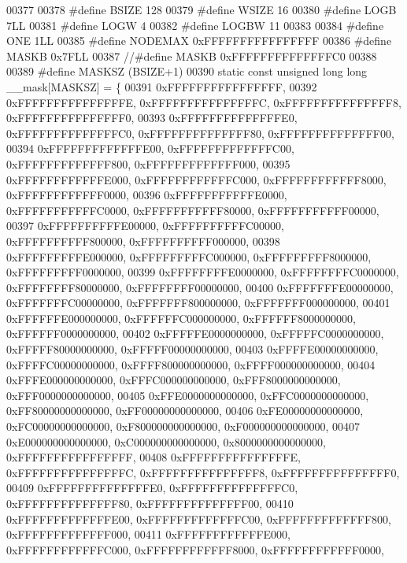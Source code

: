 \begin{DoxyCode}
00377 
00378 \textcolor{preprocessor}{#define BSIZE 128}
00379 \textcolor{preprocessor}{#define WSIZE 16}
00380 \textcolor{preprocessor}{#define LOGB 7LL}
00381 \textcolor{preprocessor}{#define LOGW 4}
00382 \textcolor{preprocessor}{#define LOGBW 11}
00383 
00384 \textcolor{preprocessor}{#define ONE 1LL}
00385 \textcolor{preprocessor}{#define NODEMAX 0xFFFFFFFFFFFFFFFF}
00386 \textcolor{preprocessor}{#define MASKB 0x7FLL}
00387 \textcolor{comment}{//#define MASKB 0xFFFFFFFFFFFFFFC0}
00388 
00389 \textcolor{preprocessor}{#define MASKSZ (BSIZE+1)}
00390 \textcolor{keyword}{static} \textcolor{keyword}{const} \textcolor{keywordtype}{unsigned} \textcolor{keywordtype}{long} \textcolor{keywordtype}{long} \_\_mask[MASKSZ] = \{
00391         0xFFFFFFFFFFFFFFFF,
00392         0xFFFFFFFFFFFFFFFE, 0xFFFFFFFFFFFFFFFC, 0xFFFFFFFFFFFFFFF8, 0xFFFFFFFFFFFFFFF0,
00393         0xFFFFFFFFFFFFFFE0, 0xFFFFFFFFFFFFFFC0, 0xFFFFFFFFFFFFFF80, 0xFFFFFFFFFFFFFF00,
00394         0xFFFFFFFFFFFFFE00, 0xFFFFFFFFFFFFFC00, 0xFFFFFFFFFFFFF800, 0xFFFFFFFFFFFFF000,
00395         0xFFFFFFFFFFFFE000, 0xFFFFFFFFFFFFC000, 0xFFFFFFFFFFFF8000, 0xFFFFFFFFFFFF0000,
00396         0xFFFFFFFFFFFE0000, 0xFFFFFFFFFFFC0000, 0xFFFFFFFFFFF80000, 0xFFFFFFFFFFF00000,
00397         0xFFFFFFFFFFE00000, 0xFFFFFFFFFFC00000, 0xFFFFFFFFFF800000, 0xFFFFFFFFFF000000,
00398         0xFFFFFFFFFE000000, 0xFFFFFFFFFC000000, 0xFFFFFFFFF8000000, 0xFFFFFFFFF0000000,
00399         0xFFFFFFFFE0000000, 0xFFFFFFFFC0000000, 0xFFFFFFFF80000000, 0xFFFFFFFF00000000,
00400         0xFFFFFFFE00000000, 0xFFFFFFFC00000000, 0xFFFFFFF800000000, 0xFFFFFFF000000000,
00401         0xFFFFFFE000000000, 0xFFFFFFC000000000, 0xFFFFFF8000000000, 0xFFFFFF0000000000,
00402         0xFFFFFE0000000000, 0xFFFFFC0000000000, 0xFFFFF80000000000, 0xFFFFF00000000000,
00403         0xFFFFE00000000000, 0xFFFFC00000000000, 0xFFFF800000000000, 0xFFFF000000000000,
00404         0xFFFE000000000000, 0xFFFC000000000000, 0xFFF8000000000000, 0xFFF0000000000000,
00405         0xFFE0000000000000, 0xFFC0000000000000, 0xFF80000000000000, 0xFF00000000000000,
00406         0xFE00000000000000, 0xFC00000000000000, 0xF800000000000000, 0xF000000000000000,
00407         0xE000000000000000, 0xC000000000000000, 0x8000000000000000, 0xFFFFFFFFFFFFFFFF,
00408         0xFFFFFFFFFFFFFFFE, 0xFFFFFFFFFFFFFFFC, 0xFFFFFFFFFFFFFFF8, 0xFFFFFFFFFFFFFFF0,
00409         0xFFFFFFFFFFFFFFE0, 0xFFFFFFFFFFFFFFC0, 0xFFFFFFFFFFFFFF80, 0xFFFFFFFFFFFFFF00,
00410         0xFFFFFFFFFFFFFE00, 0xFFFFFFFFFFFFFC00, 0xFFFFFFFFFFFFF800, 0xFFFFFFFFFFFFF000,
00411         0xFFFFFFFFFFFFE000, 0xFFFFFFFFFFFFC000, 0xFFFFFFFFFFFF8000, 0xFFFFFFFFFFFF0000,

\end{DoxyCode}
